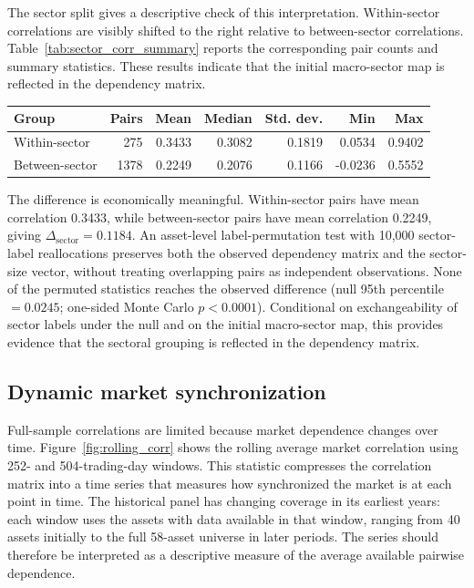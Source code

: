 The sector split gives a descriptive check of this interpretation. Within-sector correlations are visibly shifted to the right relative to between-sector correlations. Table~\ref{tab:sector_corr_summary} reports the corresponding pair counts and summary statistics. These results indicate that the initial macro-sector map is reflected in the dependency matrix.

\begin{center}
\label{tab:sector_corr_summary}
\begin{tabular}{lrrrrrr}
\toprule
Group & Pairs & Mean & Median & Std. dev. & Min & Max \\
\midrule
Within-sector & 275 & 0.3433 & 0.3082 & 0.1819 & 0.0534 & 0.9402 \\
Between-sector & 1378 & 0.2249 & 0.2076 & 0.1166 & -0.0236 & 0.5552 \\
\bottomrule
\end{tabular}
\end{center}

The difference is economically meaningful. Within-sector pairs have mean correlation 0.3433, while between-sector pairs have mean correlation 0.2249, giving $\Delta_{\mathrm{sector}}=0.1184$. An asset-level label-permutation test with 10,000 sector-label reallocations preserves both the observed dependency matrix and the sector-size vector, without treating overlapping pairs as independent observations. None of the permuted statistics reaches the observed difference (null 95th percentile $=0.0245$; one-sided Monte Carlo $p<0.0001$). Conditional on exchangeability of sector labels under the null and on the initial macro-sector map, this provides evidence that the sectoral grouping is reflected in the dependency matrix.

\subsection{Dynamic market synchronization}

Full-sample correlations are limited because market dependence changes over time. Figure~\ref{fig:rolling_corr} shows the rolling average market correlation using 252- and 504-trading-day windows. This statistic compresses the correlation matrix into a time series that measures how synchronized the market is at each point in time. The historical panel has changing coverage in its earliest years: each window uses the assets with data available in that window, ranging from 40 assets initially to the full 58-asset universe in later periods. The series should therefore be interpreted as a descriptive measure of the average available pairwise dependence.

